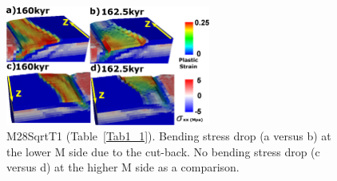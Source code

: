\begin{figure}[h]
  \centering
    \includegraphics[width=0.6\textwidth]{./Figures/fig_Results4_6_sqrt_cut_back_bending_drop.eps}
  \caption{M28SqrtT1 (Table~\hyperref[Tab1_1]{\ref{Tab1_1}}). Bending stress drop (a versus b) at the lower M side due to the cut-back. No bending stress drop (c versus d) at the higher M side as a comparison.}
 \label{fig_Results4_6}
\end{figure}


